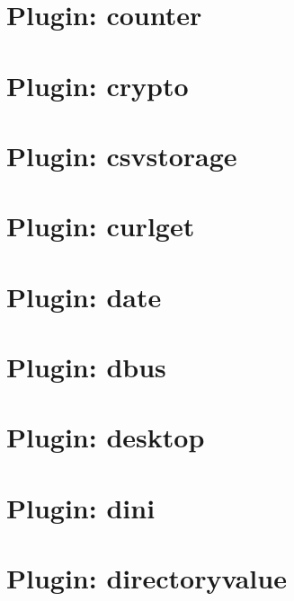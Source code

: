 \documentclass[twoside]{book}
\newcommand{\+}{\discretionary{\mbox{\scriptsize$\hookleftarrow$}}{}{}}
\begin{document}
\chapter{Plugin\+: counter}
\label{md_src_plugins_counter_README}

\chapter{Plugin\+: crypto}
\label{md_src_plugins_crypto_README}

\chapter{Plugin\+: csvstorage}
\label{md_src_plugins_csvstorage_README}

\chapter{Plugin\+: curlget}
\label{md_src_plugins_curlget_README}

\chapter{Plugin\+: date}
\label{md_src_plugins_date_README}

\chapter{Plugin\+: dbus}
\label{md_src_plugins_dbus_README}

\chapter{Plugin\+: desktop}
\label{md_src_plugins_desktop_README}

\chapter{Plugin\+: dini}
\label{md_src_plugins_dini_README}

\chapter{Plugin\+: directoryvalue}
\label{md_src_plugins_directoryvalue_README}

\end{document}
